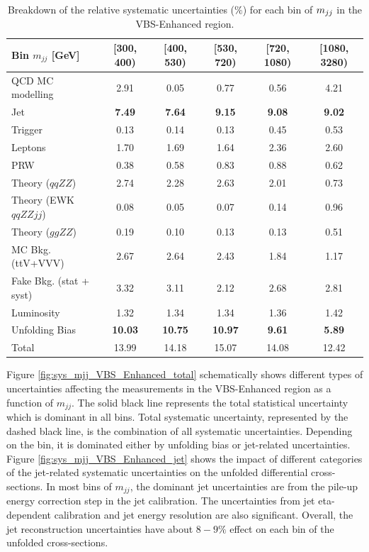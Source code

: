 \begin{table}[!htbp]
\centering
\begin{tabular}{| l || c | c | c | c | c | }
\hline \hline
Bin $m_{jj}$ [GeV] & [300, 400) & [400, 530) & [530, 720) & [720, 1080) & [1080, 3280)\\
\hline
QCD MC modelling & 2.91 & 0.05 & 0.77 & 0.56 & 4.21 \\
Jet & \textbf{7.49} & \textbf{7.64} & \textbf{9.15} & \textbf{9.08} & \textbf{9.02}\\
Trigger & 0.13 & 0.14 & 0.13 & 0.45 & 0.53\\
Leptons & 1.70 & 1.69 & 1.64 & 2.36 & 2.60 \\
PRW & 0.38 & 0.58 & 0.83 & 0.88 & 0.62\\
Theory ($qqZZ$) & 2.74 & 2.28 & 2.63 & 2.01 & 0.73\\
Theory (EWK $qqZZjj$) & 0.08 & 0.05 & 0.07 & 0.14 & 0.96\\
Theory ($ggZZ$) & 0.19 & 0.10 & 0.13 & 0.13 & 0.51\\
MC Bkg. (ttV+VVV) & 2.67 & 2.64 & 2.43 & 1.84 & 1.17\\
Fake Bkg. (stat + syst) & 3.32 & 3.11 & 2.12 & 2.68 & 2.81\\
Luminosity & 1.32 & 1.34 & 1.34 & 1.36 & 1.42\\
Unfolding Bias & \textbf{10.03} & \textbf{10.75} & \textbf{10.97} & \textbf{9.61} & \textbf{5.89}\\
\hline
Total & 13.99 & 14.18 & 15.07 & 14.08 & 12.42\\
\hline
\end{tabular}
\caption{Breakdown of the relative systematic uncertainties ($\%$) for each bin of $m_{jj}$ in the VBS-Enhanced region. \label{tab:systematics_mjj_VBS_Enhanced}}
\end{table}

Figure \ref{fig:sys_mjj_VBS_Enhanced_total} schematically shows different types of uncertainties affecting the measurements in the VBS-Enhanced region as a function of $m_{jj}$. The solid black line represents the total statistical uncertainty which is dominant in all bins. Total systematic uncertainty, represented by the dashed black line, is the combination of all systematic uncertainties. Depending on the bin, it is dominated either by unfolding bias or jet-related uncertainties. Figure \ref{fig:sys_mjj_VBS_Enhanced_jet} shows the impact of different categories of the jet-related systematic uncertainties on the unfolded differential cross-sections. In most bins of $m_{jj}$, the dominant jet uncertainties are from the pile-up energy correction step in the jet calibration. The uncertainties from jet eta-dependent calibration and jet energy resolution are also significant. Overall, the jet reconstruction uncertainties have about $8-9\%$ effect on each bin of the unfolded cross-sections.

